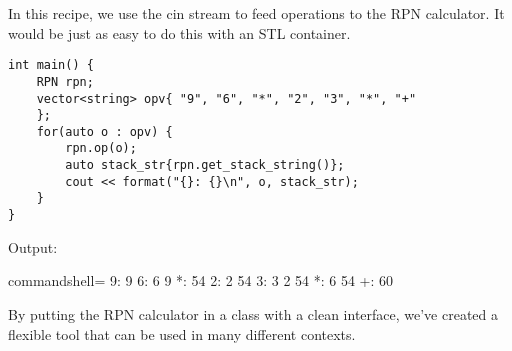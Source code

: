 In this recipe, we use the cin stream to feed operations to the RPN calculator. It would be just as easy to do this with an STL container.

\begin{lstlisting}[style=styleCXX]
int main() {
	RPN rpn;
	vector<string> opv{ "9", "6", "*", "2", "3", "*", "+"
	};
	for(auto o : opv) {
		rpn.op(o);
		auto stack_str{rpn.get_stack_string()};
		cout << format("{}: {}\n", o, stack_str);
	}
}
\end{lstlisting}

Output:

\begin{tcblisting}{commandshell={}}
9: 9
6: 6 9
*: 54
2: 2 54
3: 3 2 54
*: 6 54
+: 60
\end{tcblisting}

By putting the RPN calculator in a class with a clean interface, we've created a flexible tool that can be used in many different contexts.







